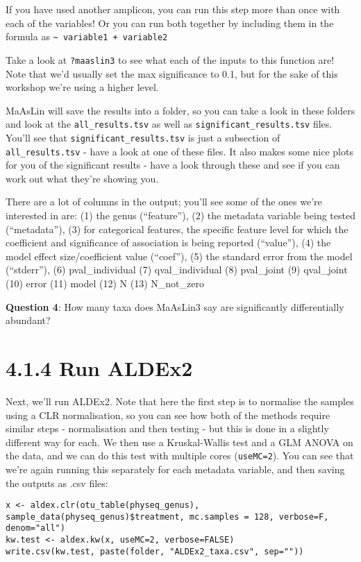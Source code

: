 \documentclass[
]{book}
\begin{document}
If you have used another amplicon, you can run this step more than once with each of the variables! Or you can run both together by including them in the formula as \texttt{\textasciitilde{}\ variable1\ +\ variable2}

Take a look at \texttt{?maaslin3} to see what each of the inputs to this function are! Note that we'd usually set the max significance to 0.1, but for the sake of this workshop we're using a higher level.

MaAsLin will save the results into a folder, so you can take a look in these folders and look at the \texttt{all\_results.tsv} as well as \texttt{significant\_results.tsv} files. You'll see that \texttt{significant\_results.tsv} is just a subsection of \texttt{all\_results.tsv} - have a look at one of these files. It also makes some nice plots for you of the significant results - have a look through these and see if you can work out what they're showing you.

There are a lot of columns in the output; you'll see some of the ones we're interested in are: (1) the genus (``feature''), (2) the metadata variable being tested (``metadata''), (3) for categorical features, the specific feature level for which the coefficient and significance of association is being reported (``value''), (4) the model effect size/coefficient value (``coef''), (5) the standard error from the model (``stderr''), (6)
pval\_individual (7) qval\_individual (8) pval\_joint (9) qval\_joint (10) error (11) model (12) N (13) N\_not\_zero

\textbf{Question 4}: How many taxa does MaAsLin3 say are significantly differentially abundant?

\section{4.1.4 Run ALDEx2}\label{run-aldex2}

Next, we'll run ALDEx2. Note that here the first step is to normalise the samples using a CLR normalisation, so you can see how both of the methods require similar steps - normalisation and then testing - but this is done in a slightly different way for each. We then use a Kruskal-Wallis test and a GLM ANOVA on the data, and we can do this test with multiple cores (\texttt{useMC=2}). You can see that we're again running this separately for each metadata variable, and then saving the outputs as .csv files:

\begin{verbatim}
x <- aldex.clr(otu_table(physeq_genus), sample_data(physeq_genus)$treatment, mc.samples = 128, verbose=F, denom="all")
kw.test <- aldex.kw(x, useMC=2, verbose=FALSE)
write.csv(kw.test, paste(folder, "ALDEx2_taxa.csv", sep=""))
\end{verbatim}
\end{document}
